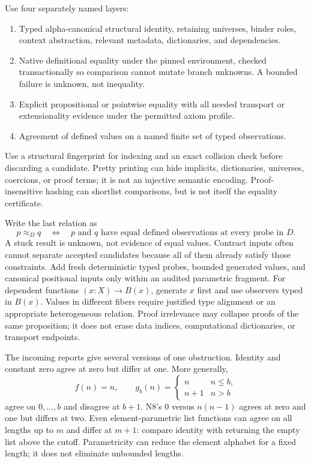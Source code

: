 Use four separately named layers:
\begin{enumerate}
\item Typed alpha-canonical structural identity, retaining universes, binder roles, context abstraction, relevant metadata, dictionaries, and dependencies.
\item Native definitional equality under the pinned environment, checked transactionally so comparison cannot mutate branch unknowns. A bounded failure is unknown, not inequality.
\item Explicit propositional or pointwise equality with all needed transport or extensionality evidence under the permitted axiom profile.
\item Agreement of defined values on a named finite set of typed observations.
\end{enumerate}
Use a structural fingerprint for indexing and an exact collision check before discarding a candidate. Pretty printing can hide implicits, dictionaries, universes, coercions, or proof terms; it is not an injective semantic encoding. Proof-insensitive hashing can shortlist comparisons, but is not itself the equality certificate.

Write the last relation as
\[
 p\approx_D q
 \quad\Longleftrightarrow\quad
 \text{$p$ and $q$ have equal defined observations at every probe in $D$}.
\]
A stuck result is unknown, not evidence of equal values. Contract inputs often cannot separate accepted candidates because all of them already satisfy those constraints. Add fresh deterministic typed probes, bounded generated values, and canonical positional inputs only within an audited parametric fragment. For dependent functions $(x:X)\to B(x)$, generate $x$ first and use observers typed in $B(x)$. Values in different fibers require justified type alignment or an appropriate heterogeneous relation. Proof irrelevance may collapse proofs of the same proposition; it does not erase data indices, computational dictionaries, or transport endpoints.

The incoming reports give several versions of one obstruction. Identity and constant zero agree at zero but differ at one. More generally,
\[
 f(n)=n,\qquad
 g_b(n)=
 \begin{cases}n&n\le b,\\n+1&n>b\end{cases}
\]
agree on $0,\ldots,b$ and disagree at $b+1$. N8's $0$ versus $n(n-1)$ agrees at zero and one but differs at two. Even element-parametric list functions can agree on all lengths up to $m$ and differ at $m+1$: compare identity with returning the empty list above the cutoff. Parametricity can reduce the element alphabet for a fixed length; it does not eliminate unbounded lengths.

